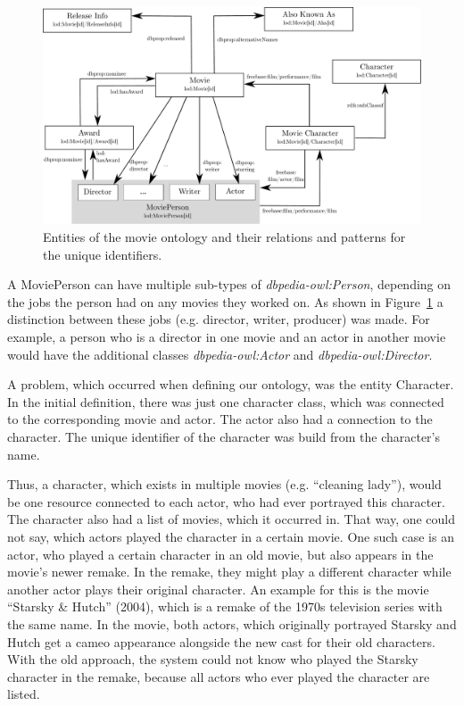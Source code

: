 \begin{figure}[h!]
\includegraphics[width=\textwidth]{images/ontology.pdf}
\caption{Entities of the movie ontology and their relations and patterns for the unique identifiers.}
\label{fig_ontology}
\end{figure}

A MoviePerson can have multiple sub-types of \textit{dbpedia-owl:Person}, depending on the jobs the person had on any movies they worked on.
As shown in Figure~\ref{fig_ontology} a distinction between these jobs (e.g. director, writer, producer) was made.
For example, a person who is a director in one movie and an actor in another movie would have the additional classes \textit{dbpedia-owl:Actor} and \textit{dbpedia-owl:Director}.

A problem, which occurred when defining our ontology, was the entity Character.
In the initial definition, there was just one character class, which was connected to the corresponding movie and actor.
The actor also had a connection to the character.
The unique identifier of the character was build from the character's name.

Thus, a character, which exists in multiple movies (e.g. ``cleaning lady''), would be one resource connected to each actor, who had ever portrayed this character.
The character also had a list of movies, which it occurred in.
That way, one could not say, which actors played the character in a certain movie.
One such case is an actor, who played a certain character in an old movie, but also appears in the movie's newer remake.
In the remake, they might play a different character while another actor plays their original character.
An example for this is the movie ``Starsky \& Hutch'' (2004), which is a remake of the 1970s television series with the same name.
In the movie, both actors, which originally portrayed Starsky and Hutch get a cameo appearance alongside the new cast for their old characters.
With the old approach, the system could not know who played the Starsky character in the remake, because all actors who ever played the character are listed.

